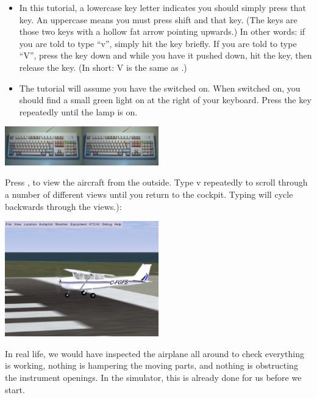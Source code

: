 \begin{itemize}
    \item In this tutorial, a lowercase key letter indicates you should simply
  press that key. An uppercase means you must press shift and that key.
  (The \textcolor{blue}{} keys are those two keys with
  a hollow fat arrow pointing upwards.) In other words: if you are told to type
  ``v'', simply hit the  key briefly.
   If you are told to type ``V'',
  press the  key down and while you have it pushed down, hit the
   key, then release the   key. (In short: V is the same as
  .)
    \item The tutorial will assume you have the  switched on.
   When switched on, you should find a small green
  light on at the right of your keyboard. Press the
  \textcolor{green}{} key repeatedly until the lamp is on.
\end{itemize}

\begin{center}
\includegraphics[width=0.5\textwidth]{img/tut_7}
\end{center}

Press , to view the aircraft from the outside. Type v repeatedly to
scroll through a number of different views until you return to the cockpit.
Typing  will cycle backwards through the views.):

\begin{center}
\includegraphics[width=0.5\textwidth]{img/tut_8}
\end{center}

In real life, we would have inspected the airplane all around to check
everything is working, nothing is hampering the moving parts,
and nothing is obstructing the instrument openings. In the simulator, this is
already done for us before we start.


